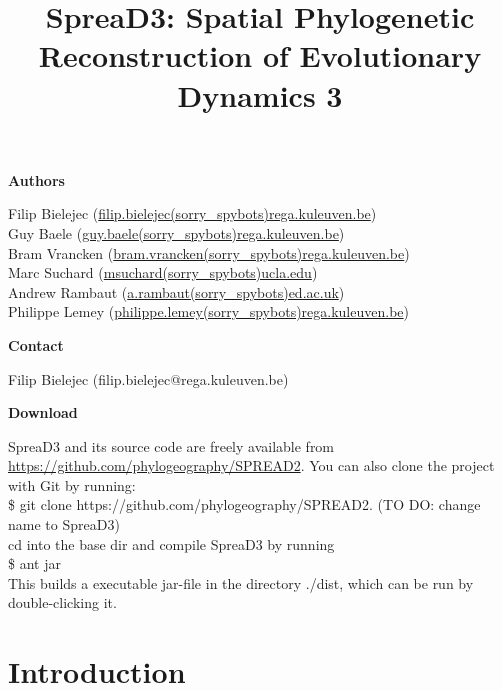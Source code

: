 \documentclass[english]{paper}
\def \spreadname {SpreaD3}
\begin{document}
\title{{\spreadname}: Spatial Phylogenetic Reconstruction of Evolutionary Dynamics 3}
\maketitle

\begin{flushleft}
\textbf{Authors}
\par\end{flushleft}

\noindent
Filip Bielejec (\url{filip.bielejec(sorry_spybots)rega.kuleuven.be}) \\
Guy Baele (\url{guy.baele(sorry_spybots)rega.kuleuven.be}) \\
Bram Vrancken  (\url{bram.vrancken(sorry_spybots)rega.kuleuven.be}) \\
Marc Suchard (\url{msuchard(sorry_spybots)ucla.edu})\\
Andrew Rambaut (\url{a.rambaut(sorry_spybots)ed.ac.uk}) \\
Philippe Lemey (\url{philippe.lemey(sorry_spybots)rega.kuleuven.be}) \\

\begin{flushleft}
\textbf{Contact}
\par\end{flushleft}
Filip Bielejec (filip.bielejec@rega.kuleuven.be) 


\begin{flushleft}
\textbf{Download}
\par\end{flushleft}
SpreaD3 and its source code are freely available from \url{https://github.com/phylogeography/SPREAD2}.
You can also clone the project with Git by running: 
\\\$ git clone https://github.com/phylogeography/SPREAD2. (TO DO: change name to SpreaD3)
\\
cd into the base dir and compile SpreaD3 by running 
\\\$ ant jar
\\
This builds a executable jar-file in the directory ./dist, which can be run by double-clicking it.

\pagebreak{}
\tableofcontents{}
\pagebreak{}

\section{Introduction}
\end{document}
